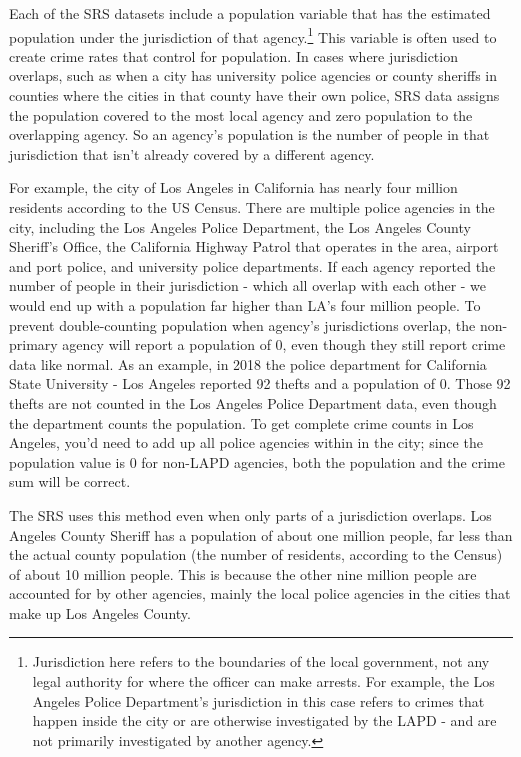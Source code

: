 \documentclass[
]{krantz}
\begin{document}
Each of the SRS datasets include a population variable that
has the estimated population under the jurisdiction of that
agency.\footnote{Jurisdiction here refers to the boundaries
  of the local government, not any legal authority for where
  the officer can make arrests. For example, the Los Angeles
  Police Department's jurisdiction in this case refers to
  crimes that happen inside the city or are otherwise
  investigated by the LAPD - and are not primarily
  investigated by another agency.} This variable is often
used to create crime rates that control for population. In
cases where jurisdiction overlaps, such as when a city has
university police agencies or county sheriffs in counties
where the cities in that county have their own police, SRS
data assigns the population covered to the most local agency
and zero population to the overlapping agency. So an
agency's population is the number of people in that
jurisdiction that isn't already covered by a different
agency.

For example, the city of Los Angeles in California has
nearly four million residents according to the US Census.
There are multiple police agencies in the city, including
the Los Angeles Police Department, the Los Angeles County
Sheriff's Office, the California Highway Patrol that
operates in the area, airport and port police, and
university police departments. If each agency reported the
number of people in their jurisdiction - which all overlap
with each other - we would end up with a population far
higher than LA's four million people. To prevent
double-counting population when agency's jurisdictions
overlap, the non-primary agency will report a population of
0, even though they still report crime data like normal. As
an example, in 2018 the police department for California
State University - Los Angeles reported 92 thefts and a
population of 0. Those 92 thefts are not counted in the Los
Angeles Police Department data, even though the department
counts the population. To get complete crime counts in Los
Angeles, you'd need to add up all police agencies within in
the city; since the population value is 0 for non-LAPD
agencies, both the population and the crime sum will be
correct.

The SRS uses this method even when only parts of a
jurisdiction overlaps. Los Angeles County Sheriff has a
population of about one million people, far less than the
actual county population (the number of residents, according
to the Census) of about 10 million people. This is because
the other nine million people are accounted for by other
agencies, mainly the local police agencies in the cities
that make up Los Angeles County.
\end{document}
